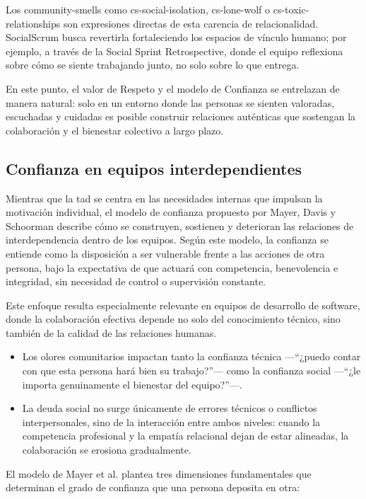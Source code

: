 Los \gls{community-smells} como \gls{cs-social-isolation}, \gls{cs-lone-wolf} o \gls{cs-toxic-relationships} son expresiones directas de esta carencia de relacionalidad.
SocialScrum busca revertirla fortaleciendo los espacios de vínculo humano; por ejemplo, a través de la Social Sprint Retrospective, donde el equipo reflexiona sobre cómo se siente trabajando junto, no solo sobre lo que entrega.

En este punto, el valor de Respeto y el modelo de Confianza se entrelazan de manera natural: solo en un entorno donde las personas se sienten valoradas, escuchadas y cuidadas es posible construir relaciones auténticas que sostengan la colaboración y el bienestar colectivo a largo plazo.

\subsection{Confianza en equipos interdependientes}

Mientras que la \acrfull{tad} se centra en las necesidades internas que impulsan la motivación individual, el modelo de confianza propuesto por Mayer, Davis y Schoorman \cite{mayer_integrative_1995} describe cómo se construyen, sostienen y deterioran las relaciones de interdependencia dentro de los equipos.
Según este modelo, la confianza se entiende como la disposición a ser vulnerable frente a las acciones de otra persona, bajo la expectativa de que actuará con competencia, benevolencia e integridad, sin necesidad de control o supervisión constante.

Este enfoque resulta especialmente relevante en equipos de desarrollo de software, donde la colaboración efectiva depende no solo del conocimiento técnico, sino también de la calidad de las relaciones humanas.

\begin{itemize}
    \item Los olores comunitarios impactan tanto la confianza técnica —``¿puedo contar con que esta persona hará bien su trabajo?''— como la confianza social —``¿le importa genuinamente el bienestar del equipo?''—.
    \item La deuda social no surge únicamente de errores técnicos o conflictos interpersonales, sino de la interacción entre ambos niveles: cuando la competencia profesional y la empatía relacional dejan de estar alineadas, la colaboración se erosiona gradualmente.
\end{itemize}

El modelo de Mayer et al. \cite{mayer_integrative_1995} plantea tres dimensiones fundamentales que determinan el grado de confianza que una persona deposita en otra:

